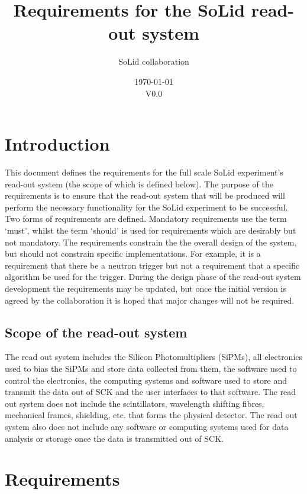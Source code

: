 \documentclass[a4paper]{article}
\title{Requirements for the SoLid read-out system}
\author[]{SoLid collaboration}
\date{\today\\V0.0}
\begin{document}
\maketitle

\abstract{
}

\tableofcontents

\section{Introduction}

This document defines the requirements for the full scale SoLid experiment's read-out system (the scope of which is defined below).
The purpose of the requirements is to ensure that the read-out system that will be produced will perform the necessary functionality for the SoLid experiment to be successful.
Two forms of requirements are defined.
Mandatory requirements use the term `must', whilst the term `should' is used for requirements which are desirably but not mandatory.
The requirements constrain the the overall design of the system, but should not constrain specific implementations.
For example, it is a requirement that there be a neutron trigger but not a requirement that a specific algorithm be used for the trigger.
During the design phase of the read-out system development the requirements may be updated, but once the initial version is agreed by the collaboration it is hoped that major changes will not be required.

\subsection{Scope of the read-out system}

The read out system includes the Silicon Photomultipliers (SiPMs), all electronics used to bias the SiPMs and store data collected from them, the software used to control the electronics,  the computing systems and software used to store and transmit the data out of SCK and the user interfaces to that software. 
The read out system does not include the scintillators, wavelength shifting fibres, mechanical frames, shielding, etc. that forms the physical detector. 
The read out system also does not include any software or computing systems used for data analysis or storage once the data is transmitted out of SCK.

\section{Requirements}
\end{document}
